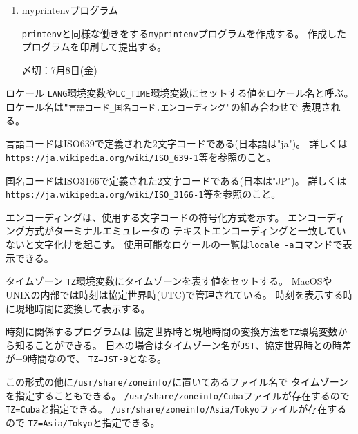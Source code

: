 \documentclass[a4j,dvipdfmx]{jarticle}
\begin{document}
\begin{enumerate}
\begin{enumerate}
\item myprintenvプログラム

\verb/printenv/と同様な働きをする\verb/myprintenv/プログラムを作成する。
作成したプログラムを印刷して提出する。

〆切：7月8日(金)

\end{enumerate}

\begin{itembox}[l]{ロケール}
\verb/LANG/環境変数や\verb/LC_TIME/環境変数にセットする値をロケール名と呼ぶ。
ロケール名は\verb/"言語コード_国名コード.エンコーディング"/の組み合わせで
表現される。

言語コードはISO639で定義された2文字コードである(日本語は"ja")。
詳しくは\verb;https://ja.wikipedia.org/wiki/ISO_639-1;等を参照のこと。

国名コードはISO3166で定義された2文字コードである(日本は"JP")。
詳しくは\verb;https://ja.wikipedia.org/wiki/ISO_3166-1;等を参照のこと。

エンコーディングは、使用する文字コードの符号化方式を示す。
エンコーディング方式がターミナルエミュレータの
テキストエンコーディングと一致していないと文字化けを起こす。
使用可能なロケールの一覧は\verb/locale -a/コマンドで表示できる。
\end{itembox}

\begin{itembox}[l]{タイムゾーン}
\verb/TZ/環境変数にタイムゾーンを表す値をセットする。
MacOSやUNIXの内部では時刻は協定世界時(UTC)で管理されている。
時刻を表示する時に現地時間に変換して表示する。

時刻に関係するプログラムは
協定世界時と現地時間の変換方法を\verb/TZ/環境変数から知ることができる。
日本の場合はタイムゾーン名が\verb/JST/、協定世界時との時差が$-9$時間なので、
\verb/TZ=JST-9/となる。

この形式の他に\verb;/usr/share/zoneinfo/;に置いてあるファイル名で
タイムゾーンを指定することもできる。
\verb;/usr/share/zoneinfo/Cuba;ファイルが存在するので
\verb;TZ=Cuba;と指定できる。
\verb;/usr/share/zoneinfo/Asia/Tokyo;ファイルが存在するので
\verb;TZ=Asia/Tokyo;と指定できる。
\end{itembox}

\end{enumerate}
\end{document}
